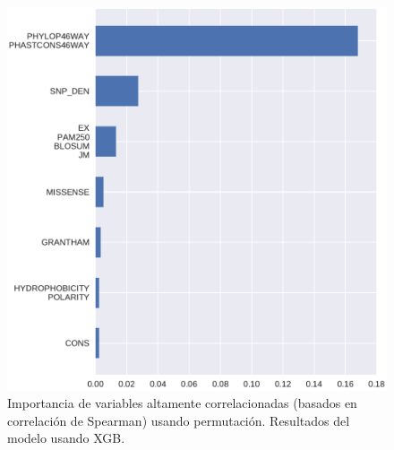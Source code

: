 \begin{figure}[H]
    \centering
    \includegraphics[scale=0.6]{documents/latex/figures/3/integral/integral_importance_cluster_xgb.pdf}
    \caption{Importancia de variables altamente correlacionadas (basados en correlación de Spearman) usando permutación. Resultados del modelo usando XGB.}
    \label{fig:importance_cluster_integral_xgb}
\end{figure}



